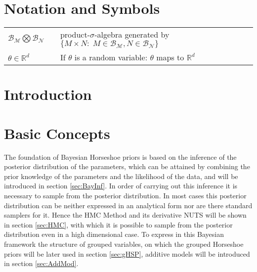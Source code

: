 \documentclass[12pt,letterpaper]{article}
\begin{document}
\newpage
\setcounter{page}{1}
\tableofcontents
\newpage


\pagestyle{fancy}
\fancyhf{}
\fancyhead[R]{\thepage}
\renewcommand{\headrulewidth}{0pt} 
\section*{Notation and Symbols}

\begin{tabular}{lll}
$\mathcal{B}_\mathcal{M}\bigotimes\mathcal{B}_\mathcal{N}$ & & product-$\sigma$-algebra generated by $\{M\times N :\; M\in\mathcal{B}_\mathcal{M}, N\in\mathcal{B}_\mathcal{N} \}$ \\
$\theta \in \mathbb{R}^d$ & & If $\theta$ is a random variable: $\theta$ maps to $\mathbb{R}^d$ 
\end{tabular}

\pagebreak
\section{Introduction}
\pagebreak

\section{Basic Concepts}
The foundation of Bayesian Horseshoe priors is based on the inference of the posterior distribution of the parameters, which can be attained by combining the prior knowledge of the parameters and the likelihood of the data, and will be introduced in section \ref{sec:BayInf}. In order of carrying out this inference it is necessary to sample from the posterior distribution.
In most cases this posterior distribution can be neither expressed in an analytical form nor are there standard samplers for it. Hence the HMC Method and its derivative NUTS will be shown in section \ref{sec:HMC}, with which it is possible to sample from the posterior distribution even in a high dimensional case. To express in this Bayesian framework the structure of grouped variables, on which the grouped Horseshoe priors will be later used in section \ref{sec:gHSP},  additive models will be introduced in section \ref{sec:AddMod}.
\end{document}
